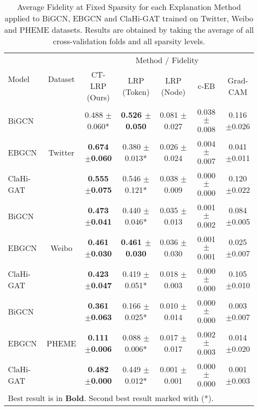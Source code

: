 \begin{table*}[hbt!]
\caption{Average Fidelity at Fixed Sparsity for each Explanation Method applied to BiGCN, EBGCN and ClaHi-GAT trained on Twitter, Weibo and PHEME datasets. Results are obtained by taking the average of all cross-validation folds and all sparsity levels.}
\centering
\begin{tabular}{|l|c|c|c|c|c|c|}
\hline
\multirow{2}{*}{Model} & \multirow{2}{*}{Dataset} & \multicolumn{5}{c|}{Method / Fidelity}                                                                          \\ \cline{3-7} 
                       &                          & CT-LRP (Ours)             & LRP (Token)      & LRP (Node)             & c-EB             & Grad-CAM         \\ \hline
BiGCN                  & \multirow{3}{*}{Twitter} & 0.488 $\pm$0.060* & \textbf{0.526 $\pm$0.050}         & 0.081 $\pm$0.027 & 0.038 $\pm$0.008 & 0.116 $\pm$0.026 \\ \cline{1-1} \cline{3-7} 
EBGCN                  &                          & \textbf{0.674 $\pm$0.060} & 0.380 $\pm$0.013*         & 0.026 $\pm$0.024 & 0.004 $\pm$0.007 & 0.041 $\pm$0.011 \\ \cline{1-1} \cline{3-7} 
ClaHi-GAT              &                          & \textbf{0.555 $\pm$0.075} & 0.546 $\pm$0.121*         & 0.038 $\pm$0.009 & 0.000 $\pm$0.000 & 0.120 $\pm$0.022 \\ \hline
BiGCN                  & \multirow{3}{*}{Weibo}   & \textbf{0.473 $\pm$0.041} & 0.440 $\pm$0.046*         & 0.035 $\pm$0.013 & 0.001 $\pm$0.002 & 0.084 $\pm$0.005 \\ \cline{1-1} \cline{3-7} 
EBGCN                  &                          & \textbf{0.461 $\pm$0.030} & \textbf{0.461 $\pm$0.030}         & 0.036 $\pm$0.030 & 0.001 $\pm$0.001 & 0.025 $\pm$0.007 \\ \cline{1-1} \cline{3-7} 
ClaHi-GAT              &                          & \textbf{0.423 $\pm$0.047} & 0.419 $\pm$0.051*         & 0.018 $\pm$0.003 & 0.000 $\pm$0.000 & 0.105 $\pm$0.010 \\ \hline
BiGCN                  & \multirow{3}{*}{PHEME}   & \textbf{0.361 $\pm$0.063} & 0.166 $\pm$0.025*         & 0.010 $\pm$0.014 & 0.000 $\pm$0.000 & 0.003 $\pm$0.007 \\ \cline{1-1} \cline{3-7} 
EBGCN                  &                          & \textbf{0.111 $\pm$0.006} & 0.088 $\pm$0.006*         & 0.017 $\pm$0.017 & 0.002 $\pm$0.003 & 0.014 $\pm$0.020 \\ \cline{1-1} \cline{3-7} 
ClaHi-GAT              &                          & \textbf{0.482 $\pm$0.000} & 0.449 $\pm$0.012* & 0.001 $\pm$0.001 & 0.000 $\pm$0.000 & 0.001 $\pm$0.003 \\ \hline
\multicolumn{7}{l}{\footnotesize{Best result is in \textbf{Bold}. Second best result marked with (*).}} \\
\end{tabular}

\label{tab:fidelity}
\end{table*}


